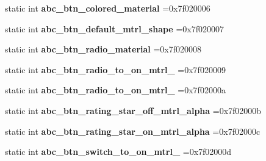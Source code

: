 \begin{DoxyCompactItemize}
\item 
\mbox{\label{classandroid_1_1support_1_1v4_1_1R_1_1drawable_a6b3857cc3557f71ba7e76dff7810788c}} 
static int {\bfseries abc\+\_\+btn\+\_\+colored\+\_\+material} =0x7f020006
\item 
\mbox{\label{classandroid_1_1support_1_1v4_1_1R_1_1drawable_a04f60ebe6f9bd7d31bda5be93b630902}} 
static int {\bfseries abc\+\_\+btn\+\_\+default\+\_\+mtrl\+\_\+shape} =0x7f020007
\item 
\mbox{\label{classandroid_1_1support_1_1v4_1_1R_1_1drawable_ac0dcf2eae3c03083347631bb6634969f}} 
static int {\bfseries abc\+\_\+btn\+\_\+radio\+\_\+material} =0x7f020008
\item 
\mbox{\label{classandroid_1_1support_1_1v4_1_1R_1_1drawable_a2109d2090c36a5bdd796c330d982365d}} 
static int {\bfseries abc\+\_\+btn\+\_\+radio\+\_\+to\+\_\+on\+\_\+mtrl\+\_} =0x7f020009
\item 
\mbox{\label{classandroid_1_1support_1_1v4_1_1R_1_1drawable_a35f9fee7cc488baf134f81daaa6b55c3}} 
static int {\bfseries abc\+\_\+btn\+\_\+radio\+\_\+to\+\_\+on\+\_\+mtrl\+\_} =0x7f02000a
\item 
\mbox{\label{classandroid_1_1support_1_1v4_1_1R_1_1drawable_a94e9fd4ed93d2cc6a5bccb7128618a08}} 
static int {\bfseries abc\+\_\+btn\+\_\+rating\+\_\+star\+\_\+off\+\_\+mtrl\+\_\+alpha} =0x7f02000b
\item 
\mbox{\label{classandroid_1_1support_1_1v4_1_1R_1_1drawable_a27a06661e236d048d52aa1032e412fe0}} 
static int {\bfseries abc\+\_\+btn\+\_\+rating\+\_\+star\+\_\+on\+\_\+mtrl\+\_\+alpha} =0x7f02000c
\item 
\mbox{\label{classandroid_1_1support_1_1v4_1_1R_1_1drawable_ae7f7d29c3703d3c90644bd8c56d1c748}} 
static int {\bfseries abc\+\_\+btn\+\_\+switch\+\_\+to\+\_\+on\+\_\+mtrl\+\_} =0x7f02000d

\end{DoxyCompactItemize}
